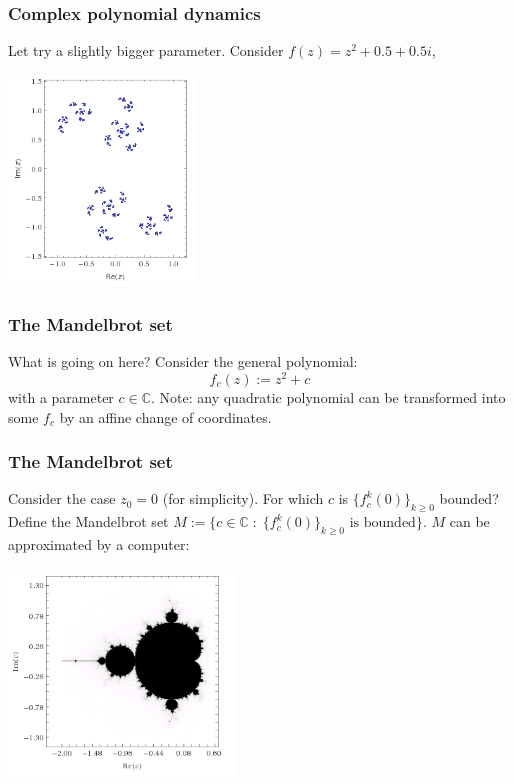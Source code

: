 \documentclass{beamer} %
\theoremstyle{definition} %
\newcommand{\Cplx}{\mathbb{C}}
\begin{document}
\begin{frame}\frametitle{Complex polynomial dynamics}
    Let try a slightly bigger parameter. Consider $f(z) = z^2+0.5+0.5i$,
    \begin{center}
        \includegraphics[width=50mm]{img/julia0505.png}
    \end{center}
\end{frame}

\begin{frame}\frametitle{The Mandelbrot set}
    What is going on here?
    Consider the general polynomial:
    \begin{equation*}
        f_c(z) := z^2+c
    \end{equation*}
    with a parameter $c \in \Cplx$.
    Note: any quadratic polynomial can be transformed into some $f_c$ by an affine change of coordinates. 
\end{frame}

\begin{frame}\frametitle{The Mandelbrot set}
    Consider the case $z_0 = 0$ (for simplicity). For which $c$ is $\{f_c^k(0)\}_{k\geq 0}$ bounded?
    Define the Mandelbrot set $M := \{c \in \Cplx\;:\;\{f^k_c(0)\}_{k\geq 0}\text{ is bounded}\}$.
    $M$ can be approximated by a computer:
    \begin{center}
        \includegraphics[width=60mm]{img/mandelbrot.png}
    \end{center}
\end{frame}
\end{document}
